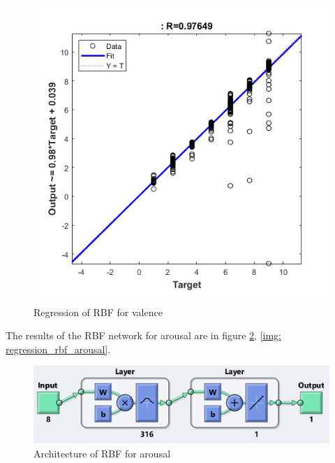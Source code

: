 \documentclass[a4paper]{report}
\begin{document}
	\begin{figure}[htbp]
		\centering
		\includegraphics[scale=1]{img/regression_rbf_valence.png}
		\caption{Regression of RBF for valence}
		\label{img: regression_rbf_valence}
	\end{figure}
\newpage
	\noindent The results of the RBF network for arousal are in figure \ref{img: rbf_arousal}, \ref{img: regression_rbf_arousal}.
	
	
	\begin{figure}[htbp]
		\centering
		\includegraphics[scale=1]{img/rbf_arousal.png}
		\caption{Architecture of RBF for arousal}
		\label{img: rbf_arousal}
	\end{figure}
\end{document}
